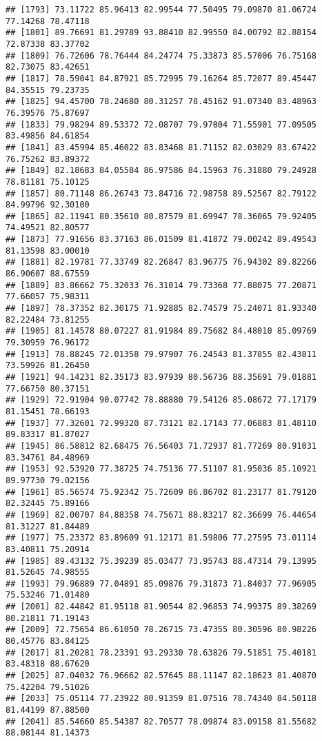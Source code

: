 \documentclass[
]{article}
\begin{document}
\begin{verbatim}
## [1793] 73.11722 85.96413 82.99544 77.50495 79.09870 81.06724 77.14268 78.47118
## [1801] 89.76691 81.29789 93.88410 82.99550 84.00792 82.88154 72.87338 83.37702
## [1809] 76.72606 78.76444 84.24774 75.33873 85.57006 76.75168 82.73075 83.42651
## [1817] 78.59041 84.87921 85.72995 79.16264 85.72077 89.45447 84.35515 79.23735
## [1825] 94.45700 78.24680 80.31257 78.45162 91.07340 83.48963 76.39576 75.87697
## [1833] 79.98294 89.53372 72.08707 79.97004 71.55901 77.09505 83.49856 84.61854
## [1841] 83.45994 85.46022 83.83468 81.71152 82.03029 83.67422 76.75262 83.89372
## [1849] 82.18683 84.05584 86.97586 84.15963 76.31880 79.24928 78.81181 75.10125
## [1857] 80.71148 86.26743 73.84716 72.98758 89.52567 82.79122 84.99796 92.30100
## [1865] 82.11941 80.35610 80.87579 81.69947 78.36065 79.92405 74.49521 82.80577
## [1873] 77.91656 83.37163 86.01509 81.41872 79.00242 89.49543 81.13598 83.00010
## [1881] 82.19781 77.33749 82.26847 83.96775 76.94302 89.82266 86.90607 88.67559
## [1889] 83.86662 75.32033 76.31014 79.73368 77.88075 77.20871 77.66057 75.98311
## [1897] 78.37352 82.30175 71.92885 82.74579 75.24071 81.93340 82.22484 73.81255
## [1905] 81.14578 80.07227 81.91984 89.75682 84.48010 85.09769 79.30959 76.96172
## [1913] 78.88245 72.01358 79.97907 76.24543 81.37855 82.43811 73.59926 81.26450
## [1921] 94.14231 82.35173 83.97939 80.56736 88.35691 79.01881 77.66750 80.37151
## [1929] 72.91904 90.07742 78.88880 79.54126 85.08672 77.17179 81.15451 78.66193
## [1937] 77.32601 72.99320 87.73121 82.17143 77.06883 81.48110 89.83317 81.87027
## [1945] 86.58812 82.68475 76.56403 71.72937 81.77269 80.91031 83.34761 84.48969
## [1953] 92.53920 77.38725 74.75136 77.51107 81.95036 85.10921 89.97730 79.02156
## [1961] 85.56574 75.92342 75.72609 86.86702 81.23177 81.79120 82.32445 75.89166
## [1969] 82.00707 84.88358 74.75671 88.83217 82.36699 76.44654 81.31227 81.84489
## [1977] 75.23372 83.89609 91.12171 81.59806 77.27595 73.01114 83.40811 75.20914
## [1985] 89.43132 75.39239 85.03477 73.95743 88.47314 79.13995 81.52645 74.98555
## [1993] 79.96889 77.04891 85.09876 79.31873 71.84037 77.96905 75.53246 71.01480
## [2001] 82.44842 81.95118 81.90544 82.96853 74.99375 89.38269 80.21811 71.19143
## [2009] 72.75654 86.61050 78.26715 73.47355 80.30596 80.98226 80.45776 83.84125
## [2017] 81.20281 78.23391 93.29330 78.63826 79.51851 75.40181 83.48318 88.67620
## [2025] 87.04032 76.96662 82.57645 88.11147 82.18623 81.40870 75.42204 79.51026
## [2033] 75.05114 77.23922 80.91359 81.07516 78.74340 84.50118 81.44199 87.88500
## [2041] 85.54660 85.54387 82.70577 78.09874 83.09158 81.55682 88.08144 81.14373

\end{verbatim}
\end{document}

